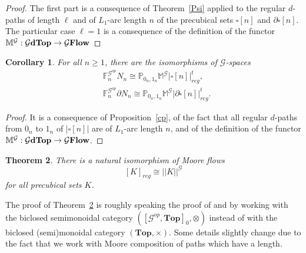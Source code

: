 \documentclass[a4paper,12pt]{amsart}
\newcommand{\de}{\partial}
\newcommand{\p}{\times}
\renewcommand{\P}{\mathbb{P}}
\newtheorem{thm}{Theorem}[section]
\newtheorem{cor}[thm]{Corollary}
\newcommand{\bth}{\begin{thm}}
\renewcommand{\eth}{\end{thm}}
\newcommand{\bpf}{\begin{proof}}
\newcommand{\epf}{\end{proof}}
\theoremstyle{definition}
\renewcommand{\top}{{\mathbf{Top}}}
\newcommand{\iso}{\cong}
\newcommand{\ot}{\otimes}
\renewcommand{\geq}{\geqslant}
\newcommand{\ptop}[1]{{\brm{{#1}dTop}}}
\newcommand{\moore}{{\mathbb{M}}}
\newcommand{\brm}[1]{{\rm{\mathbf{#1}}}}
\newcommand{\dtopG}{{\mathcal{G}\brm{Flow}}}
\newcommand{\topdgr}{[\mathcal{G}^{op},\top]}
\renewcommand{\P}{\mathbb{P}}
\begin{document}
\bpf
The first part is a consequence of Theorem~\ref{Psi} applied to the regular $d$-paths of length $\ell$ and of $L_1$-arc length $n$ of the precubical sets $\square[n]$ and $\de\square[n]$. The particular case $\ell=1$ is a consequence of the definition of the functor $\moore^{\mathcal{G}}:\ptop{\mathcal{G}}\to\dtopG$
\epf

\begin{cor} \label{cp2}
	For all $n\geq 1$, there are the isomorphisms of $\mathcal{G}$-spaces 
	\begin{align*}
		&\mathbb{F}^{\mathcal{G}^{op}}_nN_n\iso \P_{0_{n},1_{n}}\moore^{\mathcal{G}}|\square[n]|^t_{reg},\\
		&\mathbb{F}^{\mathcal{G}^{op}}_n \de N_n\iso \P_{0_{n},1_{n}}\moore^{\mathcal{G}}|\de\square[n]|^t_{reg}.
	\end{align*}
\end{cor}


\bpf
It is a consequence of Proposition~\ref{cp}, of the fact that all regular $d$-paths from $0_{n}$ to $1_{n}$ of $|\square[n]|$ are of $L_1$-arc length $n$, and of the definition of the functor $\moore^{\mathcal{G}}:\ptop{\mathcal{G}}\to\dtopG$. 
\epf

\bth \label{doublebarG}
There is a natural isomorphism of Moore flows \[[K]_{reg} \iso ||K||^{\mathcal{G}}\] for all precubical sets $K$.
\eth

The proof of Theorem~\ref{doublebarG} is roughly speaking the proof of \cite[Proposition~6.2]{NaturalRealization} and \cite[Theorem~6.3]{NaturalRealization} by working with the biclosed semimonoidal category $(\topdgr_0,\ot)$ instead of with the biclosed (semi)monoidal category $(\top,\p)$.  Some details slightly change due to the fact that we work with Moore composition of paths which have a length.
\end{document}
